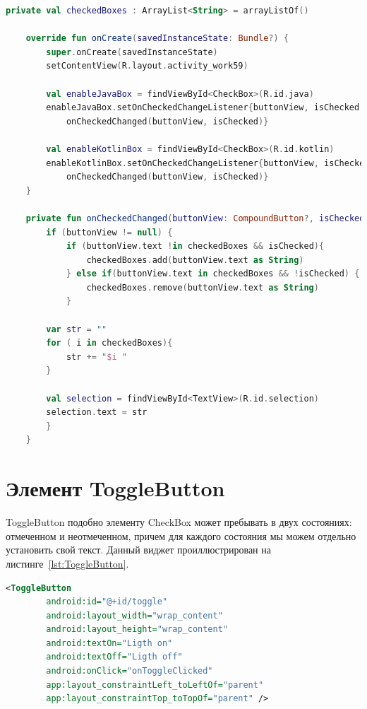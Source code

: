 \begin{lstlisting}[language=Kotlin, caption=\leftline{OnCheckedChangeListener Kotlin}, label=lst:OnCheckedChangeListener]
private val checkedBoxes : ArrayList<String> = arrayListOf()

    override fun onCreate(savedInstanceState: Bundle?) {
        super.onCreate(savedInstanceState)
        setContentView(R.layout.activity_work59)

        val enableJavaBox = findViewById<CheckBox>(R.id.java)
        enableJavaBox.setOnCheckedChangeListener{buttonView, isChecked ->
            onCheckedChanged(buttonView, isChecked)}

        val enableKotlinBox = findViewById<CheckBox>(R.id.kotlin)
        enableKotlinBox.setOnCheckedChangeListener{buttonView, isChecked ->
            onCheckedChanged(buttonView, isChecked)}
    }

    private fun onCheckedChanged(buttonView: CompoundButton?, isChecked: Boolean) {
        if (buttonView != null) {
            if (buttonView.text !in checkedBoxes && isChecked){
                checkedBoxes.add(buttonView.text as String)
            } else if(buttonView.text in checkedBoxes && !isChecked) {
                checkedBoxes.remove(buttonView.text as String)
            }

        var str = ""
        for ( i in checkedBoxes){
            str += "$i "
        }

        val selection = findViewById<TextView>(R.id.selection)
        selection.text = str
        }
    }
\end{lstlisting}

\section{Элемент ToggleButton}
ToggleButton подобно элементу CheckBox может пребывать в двух 
состояниях: отмеченном и неотмеченном, причем для каждого состояния мы 
можем отдельно установить свой текст.
Данный виджет проиллюстрирован на листинге~\ref{lst:ToggleButton}.

\begin{lstlisting}[language=xml, caption=\leftline{ToggleButton XML}, label=lst:ToggleButton]
<ToggleButton
        android:id="@+id/toggle"
        android:layout_width="wrap_content"
        android:layout_height="wrap_content"
        android:textOn="Ligth on"
        android:textOff="Ligth off"
        android:onClick="onToggleClicked"
        app:layout_constraintLeft_toLeftOf="parent"
        app:layout_constraintTop_toTopOf="parent" />
\end{lstlisting}

